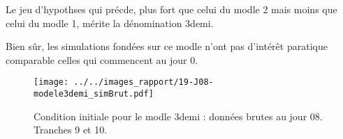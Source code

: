 Le jeu d'hypothses qui pr\'ecde, plus fort que celui du modle 2 mais moins que celui du modle 1, m\'erite la d\'enomination \og{} 3demi\fg{}.

\etoile
Bien s\^ur, les simulations fond\'ees sur ce modle n'ont pas d'int\'er\^et paratique comparable  celles qui commencent au jour 0. %


\begin{figure}[!p]
\begin{center}
\texttt{[image: ../../images\_rapport/19-J08-modele3demi\_simBrut.pdf]}
\end{center}
\caption{Condition initiale pour le modle 3demi : donn\'ees brutes au jour 08. Tranches 9 et 10.}
\label{sim_ini_18}
\end{figure}









